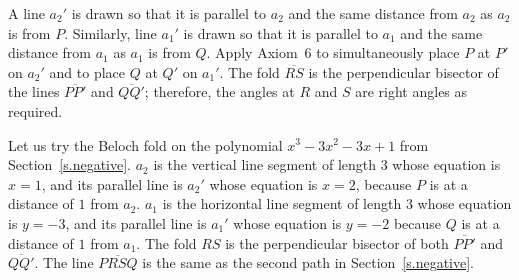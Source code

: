 A line $a_2'$ is drawn so that it is parallel to $a_2$ and the same distance from $a_2$ as $a_2$ is from $P$. Similarly, line $a_1'$ is drawn so that it is parallel to $a_1$ and the same distance from $a_1$ as $a_1$ is from $Q$. Apply Axiom~6 to simultaneously place $P$ at $P'$ on $a_2'$ and to place $Q$ at $Q'$ on $a_1'$. The fold $\overline{RS}$ is the perpendicular bisector of the lines $\overline{PP'}$ and $\overline{QQ'}$; therefore, the angles at $R$ and $S$ are right angles as required.

\newpage

Let us try the Beloch fold on the polynomial $x^3-3x^2-3x+1$ from Section~\ref{s.negative}. $a_2$ is the vertical line segment of length $3$ whose equation is $x=1$, and its parallel line is $a_2'$ whose equation is $x=2$, because $P$ is at a distance of $1$ from $a_2$. $a_1$ is the horizontal line segment of length $3$ whose equation is $y=-3$, and its parallel line is $a_1'$ whose equation is $y=-2$ because $Q$ is at a distance of $1$ from $a_1$. The fold $RS$ is the perpendicular bisector of both $\overline{PP'}$ and $\overline{QQ'}$. The line $\overline{PRSQ}$ is the same as the second path in Section~\ref{s.negative}.

